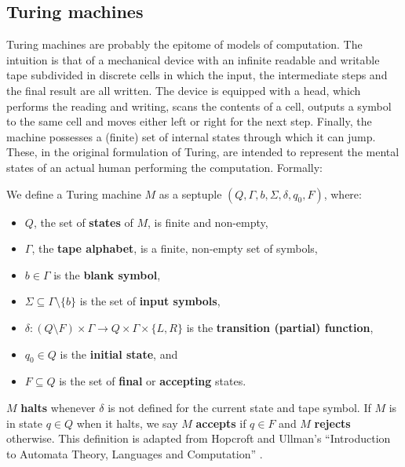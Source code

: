 \documentclass[../main.tex]{memoir}
\begin{document}
\subsection{Turing machines}

Turing machines are probably the epitome of models of computation. The intuition is that of a mechanical device with an infinite readable and writable tape subdivided in discrete cells in which the input, the intermediate steps and the final result are all written. The device is equipped with a head, which performs the reading and writing, scans the contents of a cell, outputs a symbol to the same cell and moves either left or right for the next step. Finally, the machine possesses a (finite) set of internal states through which it can jump. These, in the original formulation of Turing, are intended to represent the mental states of an actual human performing the computation. Formally:

\begin{definition}
  \label{def:turing-machine}
  We define a Turing machine $M$ as a septuple $(Q, \Gamma, b, \Sigma, \delta, q_0, F)$, where:

  \begin{itemize}
  \item $Q$, the set of \textbf{states} of $M$, is finite and non-empty,
  \item $\Gamma$, the \textbf{tape alphabet}, is a finite, non-empty set of symbols,
  \item $b \in \Gamma$ is the \textbf{blank symbol},
  \item $\Sigma \subseteq \Gamma \setminus \{b\}$ is the set of \textbf{input symbols},
  \item $\delta: (Q \setminus F) \times \Gamma \to Q \times \Gamma \times \{L, R\}$ is the \textbf{transition (partial) function},
  \item $q_0 \in Q$ is the \textbf{initial state}, and
  \item $F \subseteq Q$ is the set of \textbf{final} or \textbf{accepting} states.
  \end{itemize}
\end{definition}

$M$ \textbf{halts} whenever $\delta$ is not defined for the current state and tape symbol. If $M$ is in state $q \in Q$ when it halts, we say $M$ \textbf{accepts} if $q \in F$ and $M$ \textbf{rejects} otherwise. This definition is adapted from Hopcroft and Ullman's ``Introduction to Automata Theory, Languages and Computation'' \cite{hopcroft}.
\end{document}

